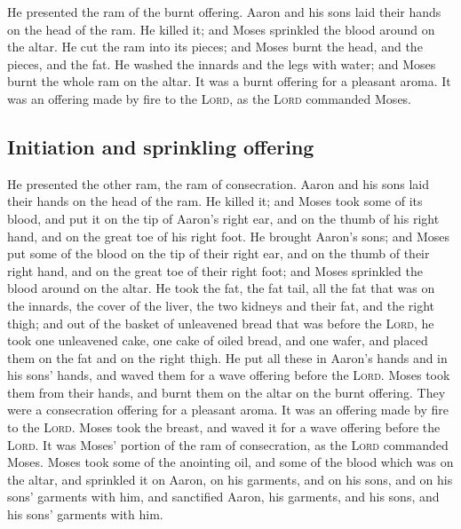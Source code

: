  He presented the ram of the burnt offering. Aaron and
his sons laid their hands on the head of the ram.  He
killed it; and Moses sprinkled the blood around on the altar.
 He cut the ram into its pieces; and Moses burnt the
head, and the pieces, and the fat.  He washed the innards
and the legs with water; and Moses burnt the whole ram on the altar. It
was a burnt offering for a pleasant aroma. It was an offering made by
fire to the \textsc{Lord}, as the \textsc{Lord} commanded Moses.

\hypertarget{initiation-and-sprinkling-offering}{%
\subsection{Initiation and sprinkling
offering}\label{initiation-and-sprinkling-offering}}

 He presented the other ram, the ram of consecration.
Aaron and his sons laid their hands on the head of the ram.
 He killed it; and Moses took some of its blood, and put
it on the tip of Aaron's right ear, and on the thumb of his right hand,
and on the great toe of his right foot.  He brought
Aaron's sons; and Moses put some of the blood on the tip of their right
ear, and on the thumb of their right hand, and on the great toe of their
right foot; and Moses sprinkled the blood around on the altar.
 He took the fat, the fat tail, all the fat that was on
the innards, the cover of the liver, the two kidneys and their fat, and
the right thigh;  and out of the basket of unleavened
bread that was before the \textsc{Lord}, he took one unleavened cake,
one cake of oiled bread, and one wafer, and placed them on the fat and
on the right thigh.  He put all these in Aaron's hands
and in his sons' hands, and waved them for a wave offering before the
\textsc{Lord}.  Moses took them from their hands, and
burnt them on the altar on the burnt offering. They were a consecration
offering for a pleasant aroma. It was an offering made by fire to the
\textsc{Lord}.  Moses took the breast, and waved it for a
wave offering before the \textsc{Lord}. It was Moses' portion of the ram
of consecration, as the \textsc{Lord} commanded Moses. 
Moses took some of the anointing oil, and some of the blood which was on
the altar, and sprinkled it on Aaron, on his garments, and on his sons,
and on his sons' garments with him, and sanctified Aaron, his garments,
and his sons, and his sons' garments with him.

